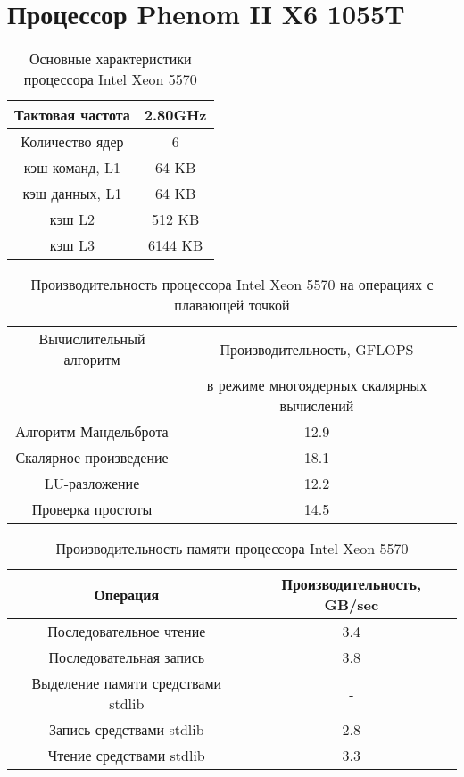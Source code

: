 \section{Процессор Phenom II X6 1055T}
\label{app_phenom}
\begin{table}[ht]
	\begin{center}
		\caption{Основные характеристики процессора Intel Xeon  5570}
		\begin{tabular}{|c|c|}
			\hline	
			Тактовая частота & 2.80GHz   \\ \hline
			Количество ядер & 6 	     \\ \hline
			кэш команд, L1 &  64 KB      \\ \hline
			кэш данных, L1 &  64 KB       \\ \hline
			кэш L2         &  512 KB      \\ \hline
			кэш L3         &  6144 KB        \\ \hline
		\end{tabular}
	\end{center} 	
\end{table} 	

\begin{table}[ht]
	\begin{center}
		\caption{Производительность процессора Intel Xeon  5570 на операциях с плавающей точкой}
		\begin{tabular}{|c|c|}
			\hline	
			Вычислительный алгоритм &  Производительность, GFLOPS \\ 
			& в режиме многоядерных скалярных вычислений \\ \hline
			Алгоритм Мандельброта  &  12.9 	\\ \hline
			Скалярное произведение &  18.1   \\ \hline
			LU-разложение          &  12.2  \\ \hline
			Проверка простоты      &  14.5  \\ \hline 
			
			
		\end{tabular}
	\end{center} 	
\end{table} 	

\begin{table}[ht]
	\begin{center}
		\caption{Производительность памяти процессора Intel Xeon 5570}
		\begin{tabular}{|c|c|}
			\hline	
			Операция  &  Производительность, GB/sec \\ \hline
			Последовательное чтение &  3.4 	\\  \hline
			Последовательная запись &  3.8   \\  \hline
			Выделение памяти средствами stdlib &  -  \\  \hline
			Запись средствами stdlib  & 2.8  \\ \hline
			Чтение средствами stdlib  & 3.3  \\ \hline 
		\end{tabular}
	\end{center} 	
\end{table} 	


